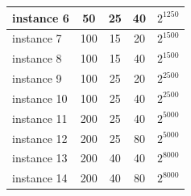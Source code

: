 \documentclass[10pt,journal,compsoc]{IEEEtran}
\newcommand\Tstrut{\rule{0pt}{2.6ex}}
\begin{document}
\begin{table}[h]
{\begin{tabular}{l|c|c|c|c}
instance 6  & 50                                                                             & 25                                                                                        & 40 & $2^{1250}$ \Tstrut                                                                                  \\ \hline
instance 7  & 100                                                                            & 15                                                                                        & 20 & $2^{1500}$  \Tstrut                                                                                \\ \hline
instance 8  & 100                                                                            & 15                                                                                        & 40& $2^{1500}$  \Tstrut                                                                                \\ \hline
instance 9  & 100                                                                            & 25                                                                                        & 20 & $2^{2500}$ \Tstrut                                                                                 \\ \hline
instance 10 & 100                                                                            & 25                                                                                        & 40 & $2^{2500}$  \Tstrut                                                                                \\ \hline
instance 11 & 200                                                                            & 25                                                                                        & 40 & $2^{5000}$  \Tstrut                                                                                \\ \hline
instance 12 & 200                                                                            & 25                                                                                        & 80& $2^{5000}$    \Tstrut                                                                              \\ \hline
instance 13 & 200                                                                            & 40                                                                                        & 40& $2^{8000}$   \Tstrut                                                                               \\ \hline
instance 14 & 200                                                                            & 40                                                                                        & 80 & $2^{8000}$  \Tstrut                                                                                \\ \hline
\end{tabular}
}
\end{table}
\end{document}
